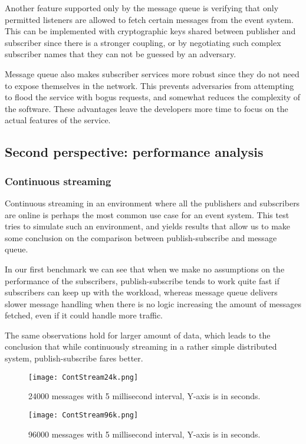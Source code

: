 \documentclass[conference]{IEEEtran}
\begin{document}
Another feature supported only by the message queue is verifying that only permitted listeners are allowed to fetch certain messages from the event system. This can be implemented with cryptographic keys shared between publisher and subscriber since there is a stronger coupling, or by negotiating such complex subscriber names that they can not be guessed by an adversary.

Message queue also makes subscriber services more robust since they do not need to expose themselves in the network. This prevents adversaries from attempting to flood the service with bogus requests, and somewhat reduces the complexity of the software. These advantages leave the developers more time to focus on the actual features of the service.

\subsection{Second perspective: performance analysis}
\subsubsection{Continuous streaming}
Continuous streaming in an environment where all the publishers and subscribers are online is perhaps the most common use case for an event system. This test tries to simulate such an environment, and yields results that allow us to make some conclusion on the comparison  between publish-subscribe and message queue.

In our first benchmark we can see that when we make no assumptions on the performance of the subscribers, publish-subscribe tends to work quite fast if subscribers can keep up with the workload, whereas message queue delivers slower message handling when there is no logic increasing the amount of messages fetched, even if it could handle more traffic.

The same observations hold for larger amount of data, which leads to the conclusion that while continuously streaming in a rather simple distributed system, publish-subscribe fares better.

\begin{figure}
    \centering
    \texttt{[image: ContStream24k.png]}
    \caption{24000 messages with 5 millisecond interval, Y-axis is in seconds.}
\end{figure}

\begin{figure}
    \centering
    \texttt{[image: ContStream96k.png]}
    \caption{96000 messages with 5 millisecond interval, Y-axis is in seconds.}
\end{figure}
\end{document}
